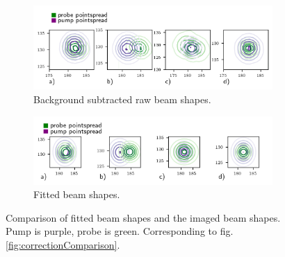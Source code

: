 \documentclass[twoside,openright,listof=numbered]{scrreprt}
\begin{document}
\begin{figure}[hbp]
\centering
\begin{subfigure}[t]{\linewidth}
\centering
\includegraphics[scale=1]{images/CompensationTestRaw.png}
\caption{Background subtracted raw beam shapes.}
\end{subfigure}
\begin{subfigure}[t]{\linewidth}
\centering
\includegraphics[scale=1]{images/CompensationTestFitted.png}
\caption{Fitted beam shapes.}
\end{subfigure}
\caption[Comparison of fitted beam shapes and the imaged beam shapes.]{Comparison of fitted beam shapes and the imaged beam shapes. Pump is purple, probe is green. Corresponding to fig. \ref{fig:correctionComparison}. \label{fig:rawVsFittedBeam}}
\end{figure}
\end{document}
